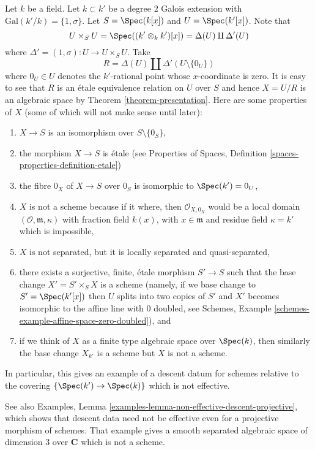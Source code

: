 \begin{example}
\label{example-non-representable-descent}
Let $k$ be a field. Let $k \subset k'$ be a degree $2$ Galois extension
with $\text{Gal}(k'/k) = \{1, \sigma\}$. Let $S = \Spec(k[x])$
and $U = \Spec(k'[x])$. Note that
$$
U \times_S U =
\Spec((k' \otimes_k k')[x]) =
\Delta(U) \amalg \Delta'(U)
$$
where $\Delta' = (1, \sigma) : U \to U \times_S U$. Take
$$
R = \Delta(U) \amalg \Delta'(U \setminus \{0_U\})
$$
where $0_U \in U$ denotes the $k'$-rational point whose $x$-coordinate is zero.
It is easy to see that $R$ is an \'etale equivalence relation on $U$ over $S$
and hence $X = U/R$ is an algebraic space by
Theorem \ref{theorem-presentation}. Here are some properties of $X$ (some
of which will not make sense until later):
\begin{enumerate}
\item $X \to S$ is an isomorphism over $S \setminus \{0_S\}$,
\item the morphism $X \to S$ is \'etale (see
Properties of Spaces,
Definition \ref{spaces-properties-definition-etale})
\item the fibre $0_X$ of $X \to S$ over $0_S$ is isomorphic to
$\Spec(k') = 0_U$,
\item $X$ is not a scheme because if it where, then $\mathcal{O}_{X, 0_X}$
would be a local domain $(\mathcal{O}, \mathfrak m, \kappa)$ with
fraction field $k(x)$, with $x \in \mathfrak m$ and residue field
$\kappa = k'$ which is impossible,
\item $X$ is not separated, but it is
locally separated and quasi-separated,
\item there exists a surjective, finite, \'etale morphism $S' \to S$
such that the base change $X' = S' \times_S X$ is a scheme (namely, if
we base change to $S' = \Spec(k'[x])$ then $U$ splits into
two copies of $S'$ and $X'$ becomes isomorphic to the affine line with
$0$ doubled, see
Schemes, Example \ref{schemes-example-affine-space-zero-doubled}), and
\item if we think of $X$ as a finite type algebraic space over
$\Spec(k)$, then similarly the base change $X_{k'}$ is a scheme
but $X$ is not a scheme.
\end{enumerate}
In particular, this gives an example of a descent datum for schemes
relative to the covering $\{\Spec(k') \to \Spec(k)\}$
which is not effective.
\end{example}

\noindent
See also Examples, 
Lemma \ref{examples-lemma-non-effective-descent-projective},
which shows that descent data need not be effective
even for a projective morphism of schemes. That example
gives a smooth separated algebraic space of dimension 3
over ${\mathbf C}$ which is not a scheme.


